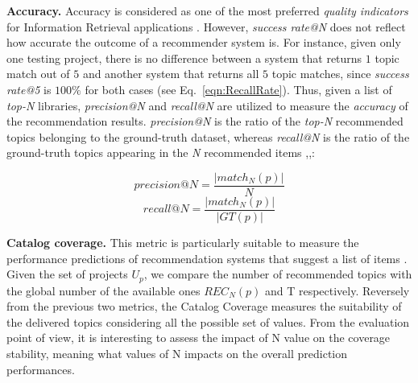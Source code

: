 \noindent \textbf{Accuracy.} Accuracy is considered as one of the most preferred \emph{quality indicators} for Information Retrieval applications \cite{Saracevic:1995:EEI:215206.215351}. However, \emph{success rate@N} does not reflect how accurate the outcome of a recommender system is. For instance, given only one testing project, there is no difference between a system that returns $1$ topic match out of $5$ and another system that returns all $5$ topic matches, since \emph{success rate@5} is $100\%$ for both cases (see Eq.~\eqref{eqn:RecallRate}). Thus, given a list of \emph{top-N} libraries, \emph{precision@N} and \emph{recall@N} are utilized to measure the \emph{accuracy} of the recommendation results. \emph{precision@N} is the ratio of the \emph{top-N} recommended topics belonging to the ground-truth dataset, whereas \emph{recall@N} is the ratio of the ground-truth topics appearing in the \emph{N} recommended items \cite{Nguyen:2019:FRS:3339505.3339636},\cite{DiNoia:2012:LOD:2362499.2362501},\cite{Davis:2006:RPR:1143844.1143874}: %


\begin{equation} \label{eqn:Precision}
precision@N = \frac{ \left | match_{N}(p) \right | }{N}
\end{equation}
\begin{equation} \label{eqn:Recall}
recall@N = \frac{ \left | match_{N}(p) \right | }{\left | GT(p) \right |}
\end{equation}

\vspace{.1cm}
\vspace{.1cm}



\noindent \textbf{Catalog coverage.} This metric is particularly suitable to measure the performance predictions of recommendation systems that suggest a list of items \cite{ge_beyond_2010}. Given the set of projects $U_p$, we compare the number of recommended topics with the global number of the available ones \ie $ REC_{N}(p)$ and T respectively. Reversely from the previous two metrics, the Catalog Coverage measures the suitability of the delivered topics considering all the possible set of values. From the evaluation point of view, it is interesting to assess the impact of N value on the coverage stability, meaning what values of N impacts on the overall prediction performances. 



